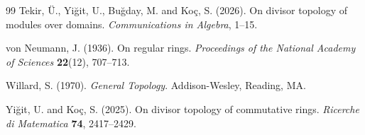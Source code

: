 \documentclass[11pt]{amsart}
\theoremstyle{plain}
\theoremstyle{definition}
\theoremstyle{remark}
\numberwithin{equation}{section}
\begin{document}
\begin{thebibliography}{99}
	Tekir, \"U., Yi\u{g}it, U., Bu\u{g}day, M. and Ko\c{c}, S. (2026).
	On divisor topology of modules over domains.
	\textit{Communications in Algebra}, 1--15.
	
	von Neumann, J. (1936).
	On regular rings.
	\textit{Proceedings of the National Academy of Sciences}
	\textbf{22}(12), 707--713.
	
	Willard, S. (1970).
	\textit{General Topology}.
	Addison-Wesley, Reading, MA.
	
	Yi\u{g}it, U. and Ko\c{c}, S. (2025).
	On divisor topology of commutative rings.
	\textit{Ricerche di Matematica}
	\textbf{74}, 2417--2429.
	
\end{thebibliography}
\end{document}
